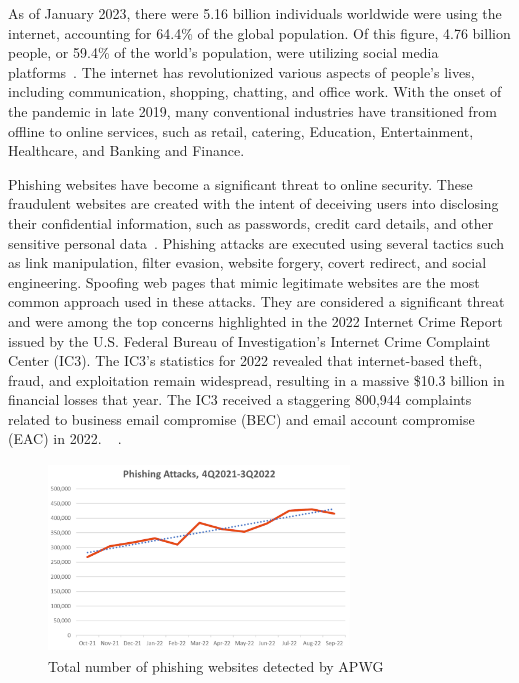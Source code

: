 \documentclass[final]{cvpr}
\begin{document}
As of January 2023, there were 5.16 billion individuals worldwide were using the internet, accounting for 64.4\% of the global population. Of this figure, 4.76 billion people, or 59.4\% of the world's population, were utilizing social media platforms~\cite{Authors01}. The internet has revolutionized various aspects of people's lives, including communication, shopping, chatting, and office work. With the onset of the pandemic in late 2019, many conventional industries have transitioned from offline to online services, such as retail, catering, Education, Entertainment, Healthcare, and Banking and Finance.


Phishing websites have become a significant threat to online security. These fraudulent websites are created with the intent of deceiving users into disclosing their confidential information, such as passwords, credit card details, and other sensitive personal data~\cite{Authors02}. Phishing attacks are executed using several tactics such as link manipulation, filter evasion, website forgery, covert redirect, and social engineering. Spoofing web pages that mimic legitimate websites are the most common approach used in these attacks. They are considered a significant threat and were among the top concerns highlighted in the 2022 Internet Crime Report issued by the U.S. Federal Bureau of Investigation's Internet Crime Complaint Center (IC3). The IC3's statistics for 2022 revealed that internet-based theft, fraud, and exploitation remain widespread, resulting in a massive \$10.3 billion in financial losses that year. The IC3 received a staggering 800,944 complaints related to business email compromise (BEC) and email account compromise (EAC) in 2022. ~\cite{FBI-IC3}
.  

\hspace*{-0.2in}
\begin{figure}[h]
   \centering
   \includegraphics[width=8cm, height=5cm]{APWG-phishing-detection-report.png}
   \caption{Total number of phishing websites detected by APWG}
   \label{fig:apwg-report}
\end{figure}
\end{document}
